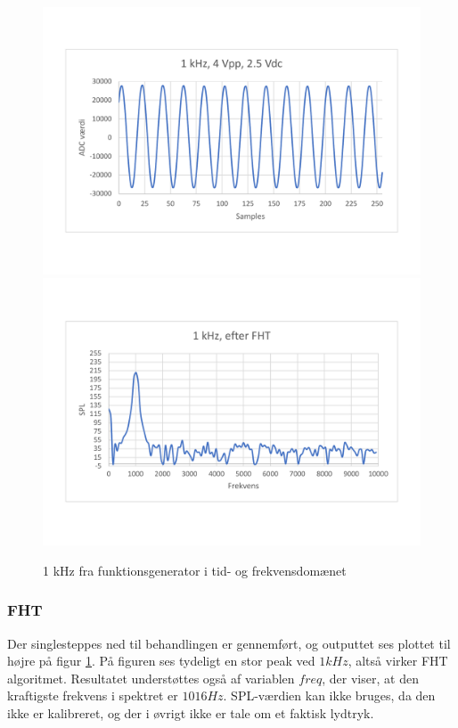 \begin{figure}[H] 
	\begin{center}
		\includegraphics[width=.45\linewidth, trim={0, 2.5cm, 1.8cm, 0}, clip]{Figur/1kHz_time_plot.pdf}\quad\includegraphics[width=.45\linewidth, trim={1.8cm, 2.5cm, 0, 0}, clip]{Figur/1kHz_FHT_plot.pdf}\quad
		\caption{1 kHz fra funktionsgenerator i tid- og frekvensdomænet }
		\label{fig:1kHz_plot}
	\end{center}
\end{figure}

\subsubsection{FHT}
Der singlesteppes ned til behandlingen er gennemført, og outputtet ses plottet til højre på figur \ref{fig:1kHz_plot}. 
På figuren ses tydeligt en stor peak ved $1 kHz$, altså virker FHT algoritmet. 
Resultatet understøttes også af variablen $freq$, der viser, at den kraftigste frekvens i spektret er $1016 Hz$. 
SPL-værdien kan ikke bruges, da den ikke er kalibreret, og der i øvrigt ikke er tale om et faktisk lydtryk. 

